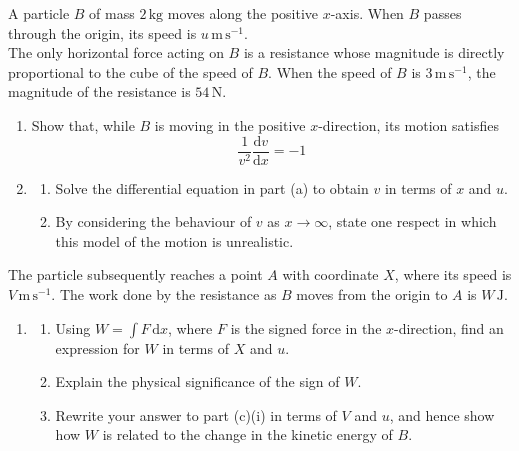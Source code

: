 \documentclass[leqno]{article}
\begin{document}
\begin{enumerate}[
  label=\textbf{\arabic*.},
  leftmargin=*,
  topsep=0pt,
  partopsep=0pt,
  parsep=0pt
]
\newpage

\questionitem

A particle $B$ of mass $2\,\mathrm{kg}$ moves along the positive $x$-axis. When $B$ passes through the origin, its speed is $u\,\mathrm{m\,s^{-1}}$. \\

The only horizontal force acting on $B$ is a resistance whose magnitude is directly proportional to the cube of the speed of $B$. When the speed of $B$ is $3\,\mathrm{m\,s^{-1}}$, the magnitude of the resistance is $54\,\mathrm{N}$. \\

\begin{enumerate}[label=\textbf{(\alph*)}]
  \item Show that, while $B$ is moving in the positive $x$-direction, its motion satisfies
  \[
  \frac{1}{v^2}\frac{\mathrm{d}v}{\mathrm{d}x}=-1
  \]
  \item
  \begin{enumerate}[label=(\roman*)]
    \item Solve the differential equation in part (a) to obtain $v$ in terms of $x$ and $u$.  \\
    \item By considering the behaviour of $v$ as $x\to\infty$, state one respect in which this model of the motion is unrealistic.  \\
  \end{enumerate}
\end{enumerate}
The particle subsequently reaches a point $A$ with coordinate $X$, where its speed is $V\,\mathrm{m\,s^{-1}}$. The work done by the resistance as $B$ moves from the origin to $A$ is $W\,\mathrm{J}$. \\
\begin{enumerate}[label=\textbf{(\alph*)}, resume]
  \item
  \begin{enumerate}[label=(\roman*)]
    \item Using $W=\int F\,\mathrm{d}x$, where $F$ is the signed force in the $x$-direction, find an expression for $W$ in terms of $X$ and $u$.  \\
    \item Explain the physical significance of the sign of $W$.  \\
    \item Rewrite your answer to part (c)(i) in terms of $V$ and $u$, and hence show how $W$ is related to the change in the kinetic energy of $B$.  \\
  \end{enumerate}
\end{enumerate}


\end{enumerate}
\end{document}
